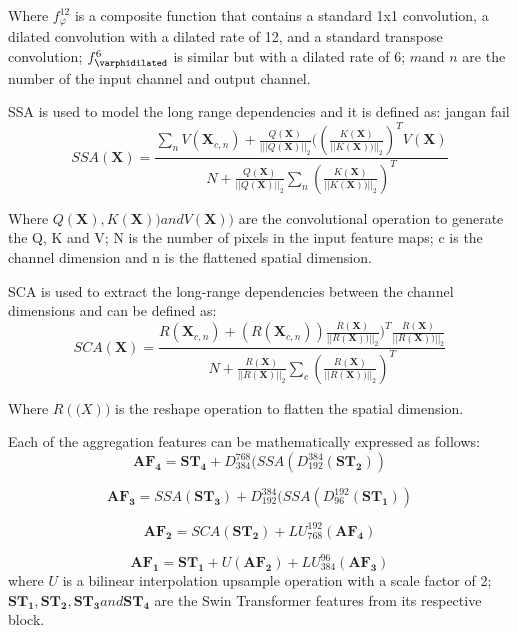 Where $f^{12}_\varphi$ is a composite function that contains a standard 1x1 convolution, a dilated convolution with a dilated rate of 12, and a standard transpose convolution; $f^{6}_\varphidilated$ is similar but with a dilated rate of 6; $m $and $n$ are the number of the input channel and output channel.

SSA is used to model the long range dependencies and it is defined as: jangan fail
\begin{equation}
    SSA(\mathbf{X}) = \frac{\sum_n V(\mathbf{X}_{c,n})+\frac{Q(\mathbf{X})}{|||Q(\mathbf{X})||_2} ((\frac{K(\mathbf{X})}{||K(\mathbf{X}))||_2})^T V(\mathbf{X})}
    {N + \frac{Q(\mathbf{X})}{||Q(\mathbf{X})||_2} \sum_n(\frac{K(\mathbf{X})}{||K(\mathbf{X}))||_2})^T }
\end{equation}

Where $Q(\mathbf{X}), K(\mathbf{X})) and V(\mathbf{X}))$ are the convolutional operation to generate the Q, K and V; N is the number of pixels in the input feature maps; c is the channel dimension and n is the flattened spatial dimension.

SCA is used to extract the long-range dependencies between the channel dimensions and can be defined as:
\begin{equation}
    SCA(\mathbf{X}) = \frac{ R(\mathbf{X}_{c,n})+(R(\mathbf{X}_{c,n}))\frac{R(\mathbf{X})}{||R(\mathbf{X}))||_2})^T \frac{R(\mathbf{X})}{||R(\mathbf{X}))||_2} }
    {N + \frac{R(\mathbf{X})}{||R(\mathbf{X})||_2} \sum_c(\frac{R(\mathbf{X})}{||R(\mathbf{X}))||_2})^T }
\end{equation}

Where $R(\mathbf(X))$ is the reshape operation to flatten the spatial dimension.

Each of the aggregation features can be mathematically expressed as follows:
\begin{equation}
    \mathbf{AF_4} = \mathbf{ST_4} + D^{768}_{384} (SSA(D^{384}_{192}(\mathbf{ST_2}))
\end{equation}

\begin{equation}
    \mathbf{AF_3} = SSA(\mathbf{ST_3})+ D^{384}_{192} (SSA(D^{192}_{96}(\mathbf{ST_1}))
\end{equation}

\begin{equation}
    \mathbf{AF_2} = SCA(\mathbf{ST_2})+ LU^{192}_{768} (\mathbf{AF_4})
\end{equation}

\begin{equation}
    \mathbf{AF_1} = \mathbf{ST_1} + U(\mathbf{AF_2}) + LU^{96}_{384}(\mathbf{AF_3})
\end{equation}
where $U$ is a bilinear interpolation upsample operation with a scale factor of 2; $\mathbf{ST_1}, \mathbf{ST_2}, \mathbf{ST_3} and \mathbf{ST_4}$ are the Swin Transformer features from its respective block.
